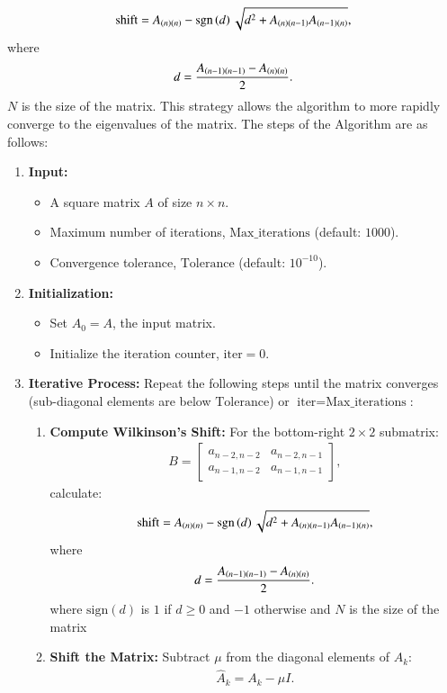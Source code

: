 \documentclass[journal]{IEEEtran}
\begin{document}
\begin{align}
\text{shift} = A_{\left(n\right)\left(n\right)} - \mathop{\mathrm{sgn}}\left(d\right) \sqrt{d^2 + A_{\left(n\right)\left(n-1\right)} A_{\left(n-1\right)\left(n\right)}},
\end{align}
where
\begin{align}
d = \frac{A_{\left(n-1\right)\left(n-1\right)} - A_{\left(n\right)\left(n\right)}}{2}.
\end{align}
$N$ is the size of the matrix. This strategy allows the algorithm to more rapidly converge to the eigenvalues of the matrix.
The steps of the Algorithm are as follows:
\begin{enumerate}
    \item \textbf{Input:} 
    \begin{itemize}
        \item A square matrix $A$ of size $n \times n$.
        \item Maximum number of iterations, $\text{Max\_iterations}$ (default: $1000$).
        \item Convergence tolerance, $\text{Tolerance}$ (default: $10^{-10}$).
    \end{itemize}

    \item \textbf{Initialization:} 
    \begin{itemize}
        \item Set $A_0 = A$, the input matrix.
        \item Initialize the iteration counter, $\text{iter} = 0$.
    \end{itemize}

    \item \textbf{Iterative Process:}
    Repeat the following steps until the matrix converges (sub-diagonal elements are below $\text{Tolerance}$) or $\text{iter} = \text{Max\_iterations}$:
    
    \begin{enumerate}
        \item \textbf{Compute Wilkinson's Shift:} For the bottom-right $2 \times 2$ submatrix:
        \begin{align}
        B = \begin{bmatrix}
        a_{n-2,n-2} & a_{n-2,n-1} \\
        a_{n-1,n-2} & a_{n-1,n-1}
        \end{bmatrix},
        \end{align}
        calculate:
       \begin{align}
            \text{shift} = A_{\left(n\right)\left(n\right)} - \mathop{\mathrm{sgn}}\left(d\right) \sqrt{d^2 + A_{\left(n\right)\left(n-1\right)} A_{\left(n-1\right)\left(n\right)}},
            \end{align}
        where
        \begin{align}
        d = \frac{A_{\left(n-1\right)\left(n-1\right)} - A_{\left(n\right)\left(n\right)}}{2}.
        \end{align}
        where $\text{sign}(d)$ is $1$ if $d \geq 0$ and $-1$ otherwise and $N$ is the size of the matrix
        \item \textbf{Shift the Matrix:} Subtract $\mu$ from the diagonal elements of $A_k$:
        \begin{align}
        \hat{A}_k = A_k - \mu I.
        \end{align}


\end{enumerate}
\end{enumerate}
\end{document}
